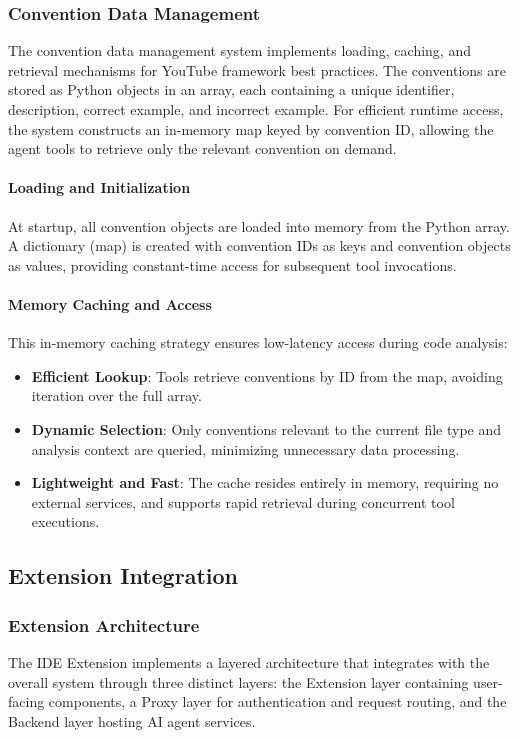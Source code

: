 \begin{spacing}{1.2}
\subsubsection{Convention Data Management}
The convention data management system implements loading, caching, and retrieval mechanisms for YouTube framework best practices. The conventions are stored as Python objects in an array, each containing a unique identifier, description, correct example, and incorrect example. For efficient runtime access, the system constructs an in-memory map keyed by convention ID, allowing the agent tools to retrieve only the relevant convention on demand. 

\paragraph{Loading and Initialization}
At startup, all convention objects are loaded into memory from the Python array. A dictionary (map) is created with convention IDs as keys and convention objects as values, providing constant-time access for subsequent tool invocations.

\paragraph{Memory Caching and Access}
This in-memory caching strategy ensures low-latency access during code analysis:

\begin{itemize}
    \item \textbf{Efficient Lookup}: Tools retrieve conventions by ID from the map, avoiding iteration over the full array.
    \item \textbf{Dynamic Selection}: Only conventions relevant to the current file type and analysis context are queried, minimizing unnecessary data processing.
    \item \textbf{Lightweight and Fast}: The cache resides entirely in memory, requiring no external services, and supports rapid retrieval during concurrent tool executions.
\end{itemize}

\subsection{Extension Integration}

\subsubsection{Extension Architecture}
The IDE Extension implements a layered architecture that integrates with the overall system through three distinct layers: the Extension layer containing user-facing components, a Proxy layer for authentication and request routing, and the Backend layer hosting AI agent services.


\end{spacing}
